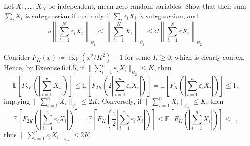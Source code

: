 \begin{problem*}[Exercise 6.4.6]\label{ex6.4.6}
	Let \(X_1, \dots , X_N\) be independent, mean zero random variables. Show that their sum \(\sum_{i} X_i\) is sub-gaussian if and only if \(\sum_{i} \varepsilon _i X_i\) is sub-gaussian, and
	\[
		c \left\lVert \sum_{i=1}^{N} \varepsilon _i X_i \right\rVert _{\psi _2}
		\leq \left\lVert \sum_{i=1}^{N} X_i \right\rVert _{\psi _2}
		\leq C \left\lVert \sum_{i=1}^{N} \varepsilon X_i \right\rVert _{\psi _2}.
	\]
\end{problem*}
\begin{answer}
	Consider \(F_K(x) \coloneqq \exp (x^2 / K^2) - 1\) for some \(K \geq 0\), which is clearly convex. Hence, by \hyperref[ex6.4.5]{Exercise 6.4.5}, if \(\lVert \sum_{i=1}^{n} \varepsilon _i X_i \rVert _{\psi _2} \leq K\), then
	\[
		\mathbb{E}_{}\left[F_{2K} \left( \left\lvert \sum_{i=1}^{n} X_i \right\rvert \right) \right]
		\leq \mathbb{E}_{}\left[F_{2K} \left( 2 \left\lvert \sum_{i=1}^{n} \varepsilon _i X_i \right\rvert \right) \right]
		= \mathbb{E}_{}\left[F_K \left( \left\lvert \sum_{i=1}^{n} \varepsilon _i X_i \right\rvert \right) \right]
		\leq 1,
	\]
	implying \(\lVert \sum_{i=1}^{n} X_i \rVert _{\psi _2} \leq 2K\). Conversely, if \(\lVert \sum_{i=1}^{n} X_i \rVert _{\psi _2} \leq K\), then
	\[
		\mathbb{E}_{}\left[F_{2K} \left( \left\lvert \sum_{i=1}^{n} \varepsilon _i X_i \right\rvert \right) \right]
		= \mathbb{E}_{}\left[F_K \left( \frac{1}{2} \left\lvert \sum_{i=1}^{n} \varepsilon _i X_i \right\rvert \right) \right]
		\leq \mathbb{E}_{}\left[F_K \left( \left\lvert \sum_{i=1}^{n} X_i \right\rvert \right) \right]
		\leq 1,
	\]
	thus \(\lVert \sum_{i=1}^{n} \varepsilon _i X_i \rVert _{\psi _2} \leq 2K\).
\end{answer}